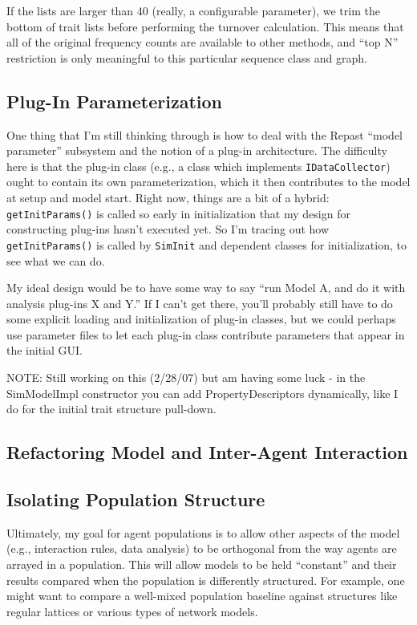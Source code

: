 \documentclass{kluwer-mem-copyright}
\begin{document}
\begin{article}
If the lists are larger than 40 (really, a configurable parameter), we trim the
bottom of trait lists before performing the turnover calculation.  This means
that all of the original frequency counts are available to other methods, and
``top N'' restriction is only meaningful to this particular sequence class and graph.


\subsection{Plug-In Parameterization}
One thing that I'm still thinking through is how to deal with the Repast ``model
parameter'' subsystem and the notion of a plug-in architecture.  The difficulty
here is that the plug-in class (e.g., a class which implements
\texttt{IDataCollector}) ought to contain its own parameterization, which it
then contributes to the model at setup and model start.  Right now, things are a
bit of a hybrid:  \texttt{getInitParams()} is called so early in initialization
that my design for constructing plug-ins hasn't executed yet.  So I'm tracing
out how \texttt{getInitParams()} is called by \texttt{SimInit} and dependent
classes for initialization, to see what we can do.  

My ideal design would be to have some way to say ``run Model A, and do it with
analysis plug-ins X and Y.''  If I can't get there, you'll probably still have
to do some explicit loading and initialization of plug-in classes, but we could
perhaps use parameter files to let each plug-in class contribute parameters that
appear in the initial GUI.  

NOTE:  Still working on this (2/28/07) but am having some luck - in the
SimModelImpl constructor you can add PropertyDescriptors dynamically, like I do
for the initial trait structure pull-down.
\subsection{Refactoring Model and Inter-Agent Interaction}

\subsection{Isolating Population Structure}
Ultimately, my goal for agent populations is to allow other aspects of the model
(e.g., interaction rules, data analysis) to be orthogonal from the way agents
are arrayed in a population.  This will allow models to be held ``constant'' and
their results compared when the population is differently structured.  For
example, one might want to compare a well-mixed population baseline against
structures like regular lattices or various types of network models.  


\end{article}
\end{document}
